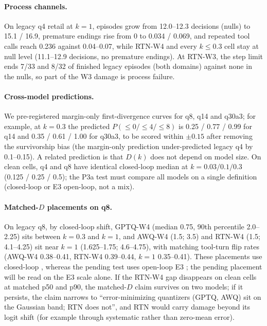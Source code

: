 \paragraph{Process channels.} On legacy q4 retail at $k{=}1$, episodes grow from 12.0--12.3 decisions (nulls) to 15.1 / 16.9, premature endings rise from 0 to 0.034 / 0.069, and repeated tool calls reach 0.236 against 0.04--0.07, while RTN-W4 and every $k \le 0.3$ cell stay at null level (11.1--12.9 decisions, no premature endings). At RTN-W3, the step limit ends 7/33 and 8/32 of finished legacy episodes (both domains) against none in the nulls, so part of the W3 damage is process failure.

\paragraph{Cross-model predictions.} We pre-registered margin-only first-divergence curves for q8, q14 and q30a3; for example, at $k{=}0.3$ the predicted $P(\le 0 / \le 4 / \le 8)$ is 0.25 / 0.77 / 0.99 for q14 and 0.35 / 0.61 / 1.00 for q30a3, to be scored within $\pm 0.15$ after removing the survivorship bias (the margin-only prediction under-predicted legacy q4 by 0.1--0.15).  A related prediction is that $D(k)$ does not depend on model size. On clean cells, q4 and q8 have identical closed-loop median \absd{} at $k = 0.03 / 0.1 / 0.3$ (0.125 / 0.25 / 0.5); the P3a test must compare all models on a single \absd{} definition (closed-loop or E3 open-loop, not a mix). 

\paragraph{Matched-$D$ placements on q8.} On legacy q8, by closed-loop shift, GPTQ-W4 (median \absd{} 0.75, 90th percentile 2.0--2.25) sits between $k{=}0.3$ and $k{=}1$, and AWQ-W4 (1.5; 3.5) and RTN-W4 (1.5; 4.1--4.25) sit near $k{=}1$ (1.625--1.75; 4.6--4.75), with matching tool-turn flip rates (AWQ-W4 0.38--0.41, RTN-W4 0.39--0.44, $k{=}1$ 0.35--0.41).  These placements use closed-loop \absd{}, whereas the pending test uses open-loop E3 \absd{}; the pending placement will be read on the E3 scale alone. If the RTN-W4 gap disappears on clean cells at matched p50 and p90, the matched-$D$ claim survives on two models; if it persists, the claim narrows to ``error-minimizing quantizers (GPTQ, AWQ) sit on the Gaussian band; RTN does not'', and RTN would carry damage beyond its logit shift (for example through systematic rather than zero-mean error).

